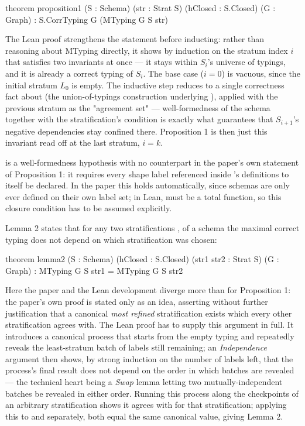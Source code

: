 \begin{leanlisting}
theorem proposition1 (S : Schema) (str : Strat S)
                    (hClosed : S.Closed) (G : Graph) :
    S.CorrTyping G (MTyping G S str)
\end{leanlisting}

The Lean proof strengthens the statement before inducting: 
 rather than reasoning about MTyping directly, 
 it shows by induction on the stratum index $i$ that 
  satisfies two invariants at once — 
 it stays within $S_i$'s universe of typings, 
 and it is already a correct typing of $S_i$. 
 The base case ($i = 0$) is vacuous, since the initial stratum $L_0$ is empty. 
 The inductive step reduces to a single correctness fact about 
  (the union-of-typings construction underlying ), 
 applied with the previous stratum as the 
 "agreement set" — well-formedness of the schema together with the stratification's 
  condition is exactly what guarantees that $S_{i+1}$'s 
 negative dependencies stay confined there. 
 Proposition 1 is then just this invariant read off at the last stratum, $i = k$.

  is a well-formedness hypothesis with no counterpart 
 in the paper's own statement of Proposition 1: 
 it requires every shape label referenced inside 's definitions 
 to itself be declared. 
 In the paper this holds automatically, 
 since schemas are only ever defined on their own label set; 
 in Lean,  must be a total function, 
 so this closure condition has to be assumed explicitly.


 Lemma 2 states that for any two stratifications ,  
  of a schema  the maximal correct typing does not depend on 
  which stratification was chosen:

 \begin{leanlisting}
 theorem lemma2 (S : Schema) (hClosed : S.Closed) 
               (str1 str2 : Strat S)
               (G : Graph) : MTyping G S str1 = MTyping G S str2
 \end{leanlisting}

 Here the paper and the Lean development diverge more than for Proposition 1: 
 the paper's own proof is stated only as an idea, 
 asserting without further justification that a canonical \emph{most refined} 
 stratification exists which every other stratification agrees with. 
 The Lean proof has to supply this argument in full. 
 It introduces a canonical process that starts from the empty typing 
 and repeatedly reveals the least-stratum batch of labels still remaining; 
 an \emph{Independence} argument then shows, 
 by strong induction on the number of labels left, 
 that the process's final result does not depend on the order 
 in which batches are revealed — 
 the technical heart being a \emph{Swap} lemma letting 
 two mutually-independent batches be revealed in either order. 
 Running this process along the checkpoints of an arbitrary 
 stratification shows it agrees with  
 for that stratification; 
 applying this to  and  
 separately, both equal the same canonical value, giving Lemma 2.